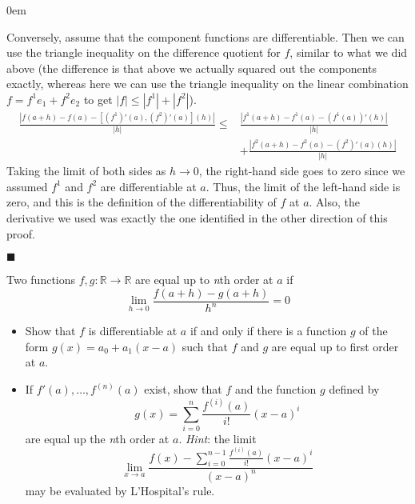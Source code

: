 \documentclass[12pt]{article}
\renewcommand{\qed}{\hfill$\blacksquare$}
\renewenvironment{proof}{\begin{addmargin}[1em]{0em}\begin{newproof}}{\end{newproof}\end{addmargin}\qed}
\newenvironment{problem}[2][Problem]{\begin{trivlist}
\item[\hskip \labelsep {\bfseries #1}\hskip \labelsep {\bfseries #2.}]}{\end{trivlist}}
\begin{document}
\begin{proof}
Conversely, assume that the component functions are differentiable. Then we can use the triangle inequality on the difference quotient for $f$, similar to what we did above (the difference is that above we actually squared out the components exactly, whereas here we can use the triangle inequality on the linear combination $f = f^1 e_1 + f^2 e_2$ to get $\left|f\right| \leq \left|f^1\right| + \left|f^2\right|$).
\begin{equation*}\begin{split}
\frac{\left| f\left(a+h\right)  - f\left(a\right) - \left[\left(f^1\right)' \left(a\right), \left(f^2\right)'\left(a\right) \right]\left(h\right)\right|}{\left| h\right|} \leq  & \frac{\left| f^1\left(a+h\right) - f^1\left(a\right) - \left(f^1\left(a\right)\right)'\left(h\right)\right|}{\left| h\right|}  \\ & + \frac{\left| f^2\left(a+h\right) - f^2\left(a\right) - \left(f^2\right)'\left(a\right)\left(h\right)\right|}{\left| h\right|}
\end{split}\end{equation*}
Taking the limit of both sides as $h\rightarrow 0$, the right-hand side goes to zero since we assumed $f^1$ and $f^2$ are differentiable at $a$. Thus, the limit of the left-hand side is zero, and this is the definition of the differentiability of $f$ at $a$. Also, the derivative we used was exactly the one identified in the other direction of this proof.
\end{proof}


\begin{problem}{2.9}
Two functions $f,g:\mathbb{R}\rightarrow \mathbb{R}$ are equal up to \textit{n}th order at $a$ if 
$$ \lim_{h\rightarrow 0} \frac{f\left(a+h\right) -g\left(a+h\right)}{h^n} = 0 $$
\begin{itemize}
	\item Show that $f$ is differentiable at $a$ if and only if there is a function $g$ of the form $g\left(x\right) = a_0 + a_1 \left(x-a\right)$ such that $f$ and $g$ are equal up to first order at $a$. \\
	\item If $f'\left(a\right),\ldots,f^{\left(n\right)}\left(a\right)$ exist, show that $f$ and the function $g$ defined by
	$$ g\left(x\right) = \sum_{i=0}^n \frac{f^{\left(i\right)}\left(a\right)}{i!} \left(x-a\right)^i $$ are equal up the \textit{n}th order at $a$. \textit{Hint}: the limit 
	$$ \lim_{x\rightarrow a} \frac{f\left(x\right) - \sum_{i=0}^{n-1} \frac{f^{\left(i\right)}\left(a\right)}{i!} \left(x-a\right)^i}{\left(x-a\right)^n} $$ may be evaluated by L'Hospital's rule.
\end{itemize} 
\end{problem}
\end{document}
